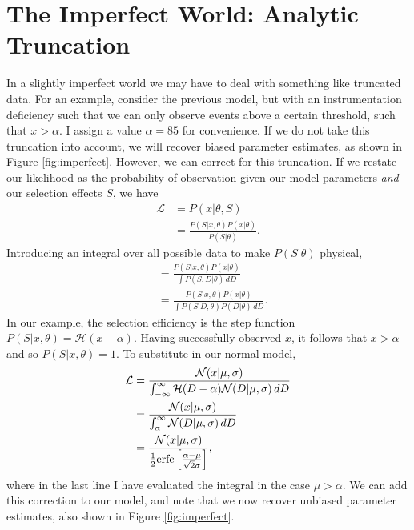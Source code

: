 \documentclass[a4paper,fleqn,usenatbib]{mnras}
\begin{document}
\section{The Imperfect World: Analytic Truncation}
\label{sec:imperfect}
In a slightly imperfect world we may have to deal with something like truncated data. For an example, consider the previous model, but with an instrumentation deficiency such that we can only observe events above a certain threshold, such that $x > \alpha$. I assign a value $\alpha=85$ for convenience. If we do not take this truncation into account, we will recover biased parameter estimates, as shown in Figure \ref{fig:imperfect}. However, we can correct for this truncation. If we restate our likelihood as the probability of observation given our model parameters \textit{and} our selection effects $S$, we have
\begin{align}
\mathcal{L} &= P(x | \theta, S)\\
&= \frac{P(S|x,\theta) P(x|\theta)}{P(S|\theta)}.
\end{align}
Introducing an integral over all possible data to make $P(S|\theta)$ physical,
\begin{align}
&= \frac{P(S|x,\theta) P(x|\theta)}{\int P(S, D|\theta)\, dD} \\
&= \frac{P(S|x,\theta) P(x|\theta)}{\int P(S | D, \theta) P(D|\theta)\, dD}.
\end{align}
In our example, the selection efficiency is the step function $P(S|x,\theta) = \mathcal{H}(x - \alpha)$. Having successfully observed $x$, it follows that $x > \alpha$ and so $P(S|x,\theta) = 1$. To substitute in our normal model,
\begin{align}
\mathcal{L} &= \frac{ \mathcal{N}(x|\mu, \sigma)}{\int_{-\infty}^\infty \mathcal{H}(D - \alpha) \mathcal{N}(D|\mu, \sigma)\, dD} \\
&= \frac{ \mathcal{N}(x|\mu, \sigma)}{\int_{\alpha}^\infty \mathcal{N}(D|\mu, \sigma)\, dD} \\
&= \frac{ \mathcal{N}(x|\mu, \sigma)}{\frac{1}{2} {\rm erfc}\left[ \frac{\alpha - \mu}{\sqrt{2}\sigma} \right]}, 
\end{align}
where in the last line I have evaluated the integral in the case $\mu > \alpha$. We can add this correction to our model, and note that we now recover unbiased parameter estimates, also shown in Figure \ref{fig:imperfect}.
\end{document}
